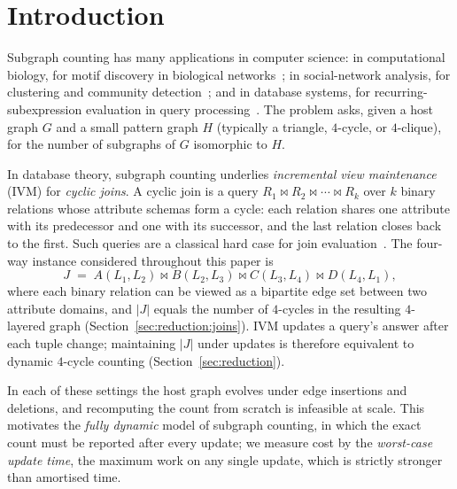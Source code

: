 \documentclass[sigconf,nonacm]{acmart}
\theoremstyle{plain}
\theoremstyle{definition}
\begin{document}

\maketitle

\section{Introduction}
\label{sec:intro}

Subgraph counting has many applications in computer science: in
computational biology, for motif discovery in biological
networks~\cite{MSOI02}; in social-network analysis, for
clustering and community detection~\cite{SMS20}; and in database
systems, for recurring-subexpression evaluation in query
processing~\cite{RPS21}. The problem asks, given a host graph $G$
and a small pattern graph $H$ (typically a triangle, $4$-cycle, or
$4$-clique), for the number of subgraphs of $G$ isomorphic to $H$.

In database theory, subgraph counting underlies
\emph{incremental view maintenance} (IVM) for \emph{cyclic joins}.
A cyclic join is a query $R_1 \bowtie R_2 \bowtie \cdots \bowtie
R_k$ over $k$ binary relations whose attribute schemas form a
cycle: each relation shares one attribute with its predecessor and
one with its successor, and the last relation closes back to the
first. Such queries are a classical hard case for join
evaluation~\cite{NRR14,NPRR18}. The four-way instance considered
throughout this paper is
\[
  J \;=\; A(L_1,L_2) \bowtie B(L_2,L_3) \bowtie C(L_3,L_4) \bowtie D(L_4,L_1),
\]
where each binary relation can be viewed as a bipartite edge set
between two attribute domains, and $|J|$ equals the number of
$4$-cycles in the resulting $4$-layered graph
(Section~\ref{sec:reduction:joins}). IVM updates a query's answer
after each tuple change; maintaining $|J|$ under updates is
therefore equivalent to dynamic $4$-cycle counting
(Section~\ref{sec:reduction}).

In each of these settings the host graph evolves under edge
insertions and deletions, and recomputing the count from scratch
is infeasible at scale. This motivates the \emph{fully dynamic}
model of subgraph counting, in which the exact count must be
reported after every update; we measure cost by the
\emph{worst-case update time}, the maximum work on any single
update, which is strictly stronger than amortised time.
\end{document}
